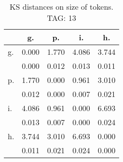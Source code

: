 \begin{table}[h!]
\begin{center}
\begin{tabular}{| l | c | c | c | c |}\hline
 & g. & p. & i. & h. \\\hline
g. & 0.000  & 1.770  & 4.086  & 3.744 \\\hline
 & 0.000  & 0.012  & 0.013  & 0.011 \\\hline
p. & 1.770  & 0.000  & 0.961  & 3.010 \\\hline
 & 0.012  & 0.000  & 0.007  & 0.021 \\\hline
i. & 4.086  & 0.961  & 0.000  & 6.693 \\\hline
 & 0.013  & 0.007  & 0.000  & 0.024 \\\hline
h. & 3.744  & 3.010  & 6.693  & 0.000 \\\hline
 & 0.011  & 0.021  & 0.024  & 0.000 \\\hline
\end{tabular}
\caption{KS distances on size of tokens. TAG: 13}
\end{center}
\end{table}